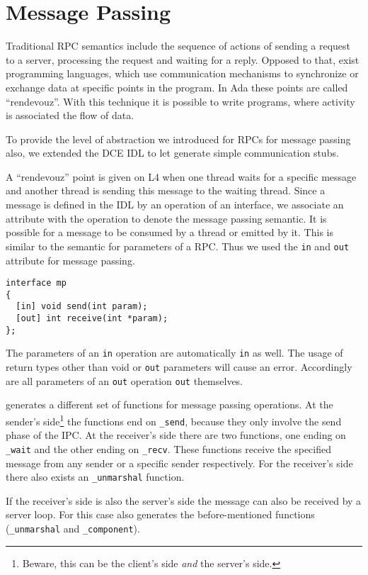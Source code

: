 \section{Message Passing}
\label{sec:message-passing}
Traditional RPC semantics include the sequence of actions of sending a
request to a server, processing the request and waiting for a reply.
Opposed to that, exist programming languages, which use communication
mechanisms to synchronize or exchange data at specific points in the
program. In Ada these points are called ``rendevouz''. With this technique
it is possible to write programs, where activity is associated the
flow of data.

To provide the level of abstraction we introduced for RPCs for message
passing also, we extended the DCE IDL to let \dice{} generate simple
communication stubs.

A ``rendevouz'' point is given on L4 when one thread waits for a
specific message and another thread is sending this message to the
waiting thread. Since a message is defined in the IDL by an operation of an 
interface, we associate an attribute with the operation to denote 
the message passing semantic. It is possible for a message to be
consumed by a thread or emitted by it. This is similar to the semantic
for parameters of a RPC. Thus we used the \verb|in| and \verb|out|
attribute for message passing.

\begin{verbatim}
interface mp
{
  [in] void send(int param);
  [out] int receive(int *param);
};
\end{verbatim}

The parameters of an \verb|in| operation are automatically \verb|in| as
well. The usage of return types other than void or \verb|out| parameters
will cause an error. Accordingly are all parameters of an \verb|out|
operation \verb|out| themselves.

\dice{} generates a different set of functions for message passing
operations. At the sender's side\footnote{Beware, this can be the client's
side \emph{and} the server's side.} the functions end on \verb|_send|, because
they only involve the send phase of the IPC. At the receiver's side
there are two functions, one ending on \verb|_wait| and the other ending
on \verb|_recv|. These functions receive the specified message from
any sender or a specific sender respectively. For the receiver's side
there also exists an \verb|_unmarshal| function.

If the receiver's side is also the server's side the message
can also be received by a server loop. For this case \dice{} also
generates the before-mentioned functions (\verb|_unmarshal| and 
\verb|_component|). 

